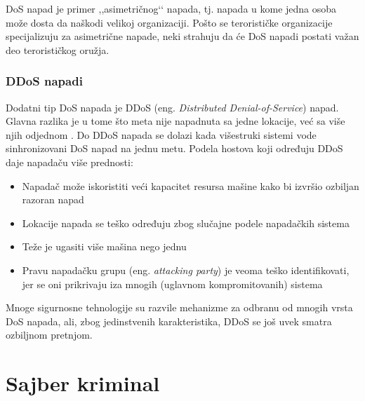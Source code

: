 \documentclass[a4paper]{article}
\theoremstyle{break}
\begin{document}
{DoS napad je primer ,,asimetričnog‘‘ napada, tj. napada u kome jedna osoba može dosta da naškodi velikoj organizaciji. Pošto se terorističke organizacije specijalizuju za asimetrične napade, neki strahuju da će DoS napadi postati važan deo terorističkog oružja.

\subsubsection{DDoS napadi}
\label{subsubsec:DDoS}

Dodatni tip DoS napada je DDoS (eng. {\em Distributed Denial-of-Service}) napad. Glavna razlika je u tome što meta nije napadnuta sa jedne lokacije, već sa više njih odjednom \cite{ddos}. Do DDoS napada se dolazi kada višestruki sistemi vode sinhronizovani DoS napad na jednu metu. Podela hostova koji određuju DDoS daje napadaču više prednosti:
\begin{itemize}
\item Napadač može iskoristiti veći kapacitet resursa mašine kako bi izvršio ozbiljan razoran napad
\item Lokacije napada se teško određuju zbog slučajne podele napadačkih sistema
\item Teže je ugasiti više mašina nego jednu
\item Pravu napadačku grupu (eng. {\em attacking party}) je veoma teško identifikovati, jer se oni prikrivaju iza mnogih (uglavnom kompromitovanih) sistema
\end{itemize}

Mnoge sigurnosne tehnologije su razvile mehanizme za odbranu od mnogih vrsta DoS napada, ali, zbog jedinstvenih karakteristika, DDoS se još uvek smatra ozbiljnom pretnjom.\\


\section{Sajber kriminal}
\label{sec:sajber_kriminal}


}
\end{document}
